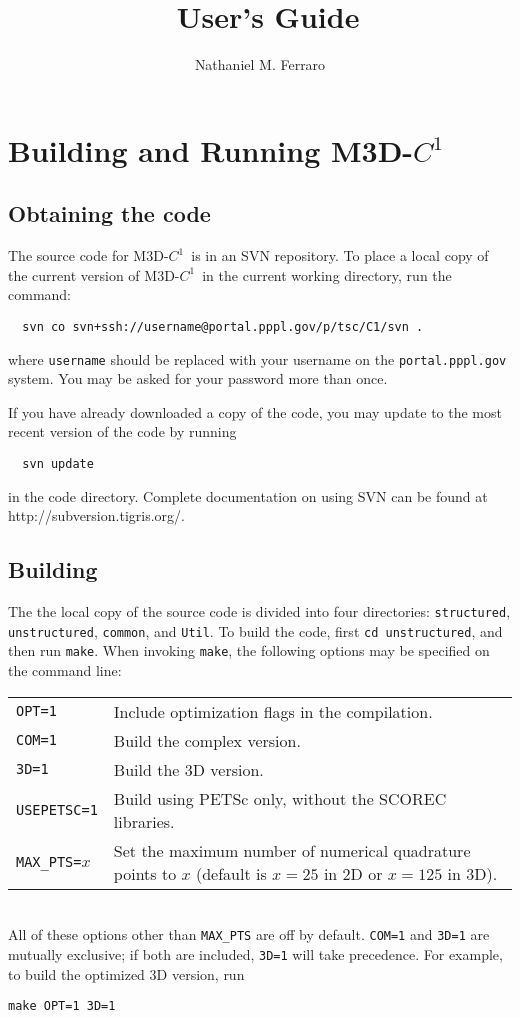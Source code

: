 \documentclass[letterpaper]{book}
\title{\codename\ User's Guide}
\author{Nathaniel M. Ferraro}
\newcommand{\codename}{\textsc{M3D-$C^1$}}
\newcommand{\svnurl}{http://subversion.tigris.org/}
\begin{document}
\maketitle

\tableofcontents


\chapter{Building and Running \codename}

\section{Obtaining the code}

The source code for \codename\ is in an SVN repository.  To place a
local copy of the current version of \codename\ in the current working
directory, run the command:
\begin{verbatim}
  svn co svn+ssh://username@portal.pppl.gov/p/tsc/C1/svn .
\end{verbatim}
where \texttt{username} should be replaced with your username on the
\texttt{portal.pppl.gov} system.  You may be asked for your password
more than once.

If you have already downloaded a copy of the code, you may update to
the most recent version of the code by running
\begin{verbatim}
  svn update
\end{verbatim}
in the code directory.  Complete documentation on using SVN can be
found at \svnurl.

\section{Building}

The the local copy of the source code is divided into four
directories: \texttt{structured}, \texttt{unstructured},
\texttt{common}, and \texttt{Util}.  To build the code, first
\texttt{cd unstructured}, and then run \texttt{make}.  When invoking
\texttt{make}, the following options may be specified on the command
line:\\
\begin{tabular}{lp{3.5in}}
  \texttt{OPT=1}      & Include optimization flags in the compilation.\\
  \texttt{COM=1}      & Build the complex version.\\
  \texttt{3D=1}       & Build the 3D version.\\
  \texttt{USEPETSC=1} & Build using PETSc only, without the SCOREC libraries.\\
  \texttt{MAX\_PTS=}$x$ & Set the maximum number of numerical quadrature
  points to $x$ (default is $x=25$ in 2D or $x=125$ in 3D).
\end{tabular}\\
All of these options other than \texttt{MAX\_PTS} are off by
default. \texttt{COM=1} and \texttt{3D=1} are mutually exclusive; if
both are included, \texttt{3D=1} will take precedence.  For example,
to build the optimized 3D version, run
\begin{verbatim}
make OPT=1 3D=1
\end{verbatim}
\end{document}
